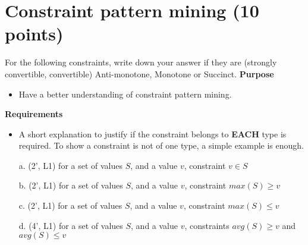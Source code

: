 \section{Constraint pattern mining (10 points)}
For the following constraints, write down your answer if they are (strongly convertible, convertible) Anti-monotone, Monotone or Succinct. 
\textbf{Purpose} 
\begin{itemize}\vspace{-2mm}\setlength\itemsep{-1mm}
\item Have a better understanding of constraint pattern mining.
\end{itemize}
\textbf{Requirements}
\begin{itemize}\vspace{-2mm}\setlength\itemsep{-1mm}
\item A short explanation to justify if the constraint belongs to \textbf{EACH} type is required. To show a constraint is not of one type, a simple example is enough.
\end{itemize}

\begin{itemize}
\item[a.] (2', L1) for a set of values $S$, and a value $v$, constraint $v \in S$
\item[b.] (2', L1) for a set of values $S$, and a value $v$, constraint $max(S) \geq v$
\item[c.] (2', L1) for a set of values $S$, and a value $v$, constraint $max(S) \leq v$
\item[d.] (4', L1) for a set of values $S$, and a value $v$, constraints $avg(S) \geq v$ and $avg(S) \leq v$
\end{itemize}



